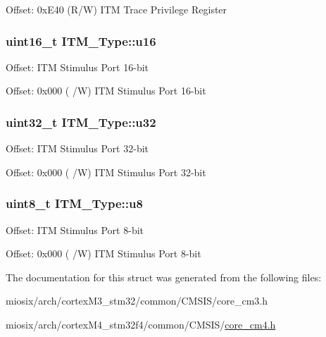 Offset\-: 0x\-E40 (R/\-W) I\-T\-M Trace Privilege Register \hypertarget{struct_i_t_m___type_a12aa4eb4d9dcb589a5d953c836f4e8f4}{
\subsubsection[{u16}]{ uint16\-\_\-t I\-T\-M\-\_\-\-Type\-::u16}}\label{struct_i_t_m___type_a12aa4eb4d9dcb589a5d953c836f4e8f4}
Offset\-: I\-T\-M Stimulus Port 16-\/bit

Offset\-: 0x000 ( /\-W) I\-T\-M Stimulus Port 16-\/bit \hypertarget{struct_i_t_m___type_a6882fa5af67ef5c5dfb433b3b68939df}{
\subsubsection[{u32}]{ uint32\-\_\-t I\-T\-M\-\_\-\-Type\-::u32}}\label{struct_i_t_m___type_a6882fa5af67ef5c5dfb433b3b68939df}
Offset\-: I\-T\-M Stimulus Port 32-\/bit

Offset\-: 0x000 ( /\-W) I\-T\-M Stimulus Port 32-\/bit \hypertarget{struct_i_t_m___type_abea77b06775d325e5f6f46203f582433}{
\subsubsection[{u8}]{ uint8\-\_\-t I\-T\-M\-\_\-\-Type\-::u8}}\label{struct_i_t_m___type_abea77b06775d325e5f6f46203f582433}
Offset\-: I\-T\-M Stimulus Port 8-\/bit

Offset\-: 0x000 ( /\-W) I\-T\-M Stimulus Port 8-\/bit 

The documentation for this struct was generated from the following files\-:\begin{DoxyCompactItemize}
\item 
miosix/arch/cortex\-M3\-\_\-stm32/common/\-C\-M\-S\-I\-S/core\-\_\-cm3.\-h\item 
miosix/arch/cortex\-M4\-\_\-stm32f4/common/\-C\-M\-S\-I\-S/\hyperlink{core__cm4_8h}{core\-\_\-cm4.\-h}\end{DoxyCompactItemize}
